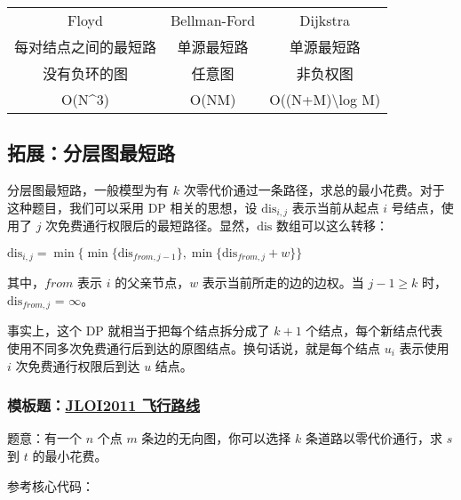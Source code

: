 \begin{tabular}{ccc}
\hline
Floyd& Bellman-Ford& Dijkstra\\每对结点之间的最短路& 单源最短路& 单源最短路\\没有负环的图& 任意图& 非负权图\\O(N\textasciicircum{}3)& O(NM)& O((N+M)\textbackslash{}log M)\\\hline
\end{tabular}

\subsection{拓展：分层图最短路}

分层图最短路，一般模型为有 $k$ 次零代价通过一条路径，求总的最小花费。对于这种题目，我们可以采用 DP 相关的思想，设 $\text{dis}_{i, j}$ 表示当前从起点 $i$ 号结点，使用了 $j$ 次免费通行权限后的最短路径。显然，$\text{dis}$ 数组可以这么转移：

$\text{dis}_{i, j} = \min\{\min\{\text{dis}_{from, j - 1}\}, \min\{\text{dis}_{from,j} + w\}\}$

其中，$from$ 表示 $i$ 的父亲节点，$w$ 表示当前所走的边的边权。当 $j - 1 \geq k$ 时，$\text{dis}_{from, j}$ = $\infty$。

事实上，这个 DP 就相当于把每个结点拆分成了 $k+1$ 个结点，每个新结点代表使用不同多次免费通行后到达的原图结点。换句话说，就是每个结点 $u_i$ 表示使用 $i$ 次免费通行权限后到达 $u$ 结点。

\subsubsection{模板题：\href{https://www.luogu.org/problemnew/show/P4568}{JLOI2011 飞行路线}}

题意：有一个 $n$ 个点 $m$ 条边的无向图，你可以选择 $k$ 条道路以零代价通行，求 $s$ 到 $t$ 的最小花费。

参考核心代码：

